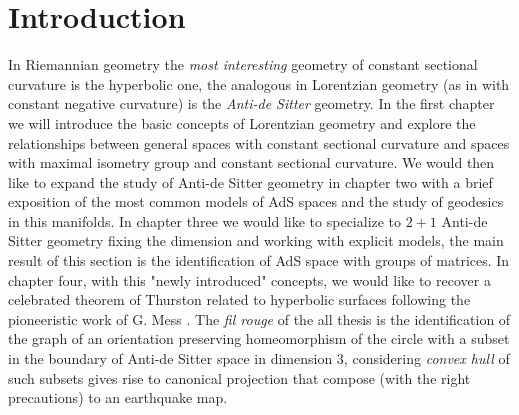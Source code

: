 \chapter*{Introduction}
In Riemannian geometry the \textit{most interesting} geometry of constant sectional curvature is the hyperbolic one, the analogous in Lorentzian geometry  (as in with constant negative curvature) is the \textit{Anti-de Sitter} geometry. In the first chapter we will introduce the basic concepts of Lorentzian geometry and explore the relationships between general spaces with constant sectional curvature and spaces with maximal isometry group and constant sectional curvature.
We would then like to expand the study of Anti-de Sitter geometry in chapter two with a brief exposition of the most common models of AdS spaces and the study of geodesics in this manifolds. 
In chapter three we would like to specialize to $2+1$ Anti-de Sitter geometry fixing the dimension and working with explicit models, the main result of this section is the identification of AdS space with groups of matrices. 
In chapter four, with this "newly introduced" concepts, we would like to recover a celebrated theorem of Thurston \cite{thurston1986earthquakes} related to hyperbolic surfaces following the pioneeristic work of G. Mess \cite{Mess}. The \textit{fil rouge} of the all thesis is the identification of the graph of an orientation preserving homeomorphism of the circle with a subset in the boundary of Anti-de Sitter space in dimension 3, considering \textit{convex hull} of such subsets gives rise to canonical projection that compose (with the right precautions) to an earthquake map.